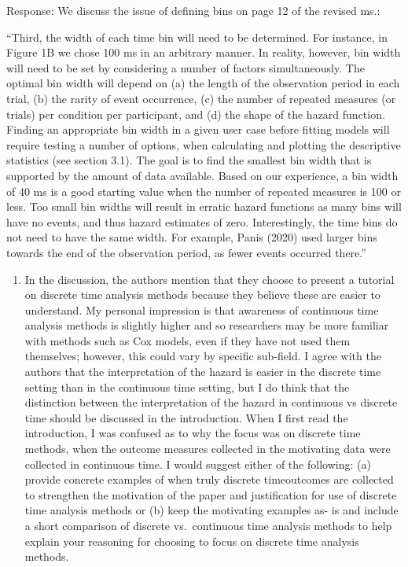 \documentclass[
]{article}
\providecommand{\tightlist}{%
  \setlength{\itemsep}{0pt}\setlength{\parskip}{0pt}}
\renewenvironment{quote}{\begin{leftbar}}{\end{leftbar}}
\begin{document}
Response: We discuss the issue of defining bins on page 12 of the
revised ms.:

``Third, the width of each time bin will need to be determined. For
instance, in Figure 1B we chose 100 ms in an arbitrary manner. In
reality, however, bin width will need to be set by considering a number
of factors simultaneously. The optimal bin width will depend on (a) the
length of the observation period in each trial, (b) the rarity of event
occurrence, (c) the number of repeated measures (or trials) per
condition per participant, and (d) the shape of the hazard function.
Finding an appropriate bin width in a given user case before fitting
models will require testing a number of options, when calculating and
plotting the descriptive statistics (see section 3.1). The goal is to
find the smallest bin width that is supported by the amount of data
available. Based on our experience, a bin width of 40 ms is a good
starting value when the number of repeated measures is 100 or less. Too
small bin widths will result in erratic hazard functions as many bins
will have no events, and thus hazard estimates of zero. Interestingly,
the time bins do not need to have the same width. For example, Panis
(2020) used larger bins towards the end of the observation period, as
fewer events occurred there.''

\begin{quote}
\begin{enumerate}
\def\labelenumi{\arabic{enumi}.}
\setcounter{enumi}{1}
\tightlist
\item
  In the discussion, the authors mention that they choose to present a
  tutorial on discrete time analysis methods because they believe these
  are easier to understand. My personal impression is that awareness of
  continuous time analysis methods is slightly higher and so researchers
  may be more familiar with methods such as Cox models, even if they
  have not used them themselves; however, this could vary by specific
  sub-field. I agree with the authors that the interpretation of the
  hazard is easier in the discrete time setting than in the continuous
  time setting, but I do think that the distinction between the
  interpretation of the hazard in continuous vs discrete time should be
  discussed in the introduction. When I first read the introduction, I
  was confused as to why the focus was on discrete time methods, when
  the outcome measures collected in the motivating data were collected
  in continuous time. I would suggest either of the following: (a)
  provide concrete examples of when truly discrete timeoutcomes are
  collected to strengthen the motivation of the paper and justification
  for use of discrete time analysis methods or (b) keep the motivating
  examples as- is and include a short comparison of discrete
  vs.~continuous time analysis methods to help explain your reasoning
  for choosing to focus on discrete time analysis methods.
\end{enumerate}
\end{quote}
\end{document}

